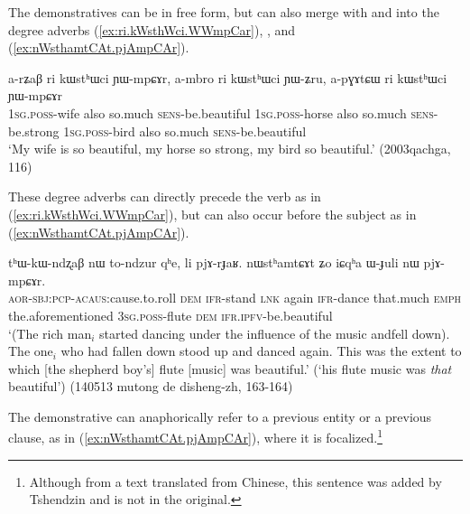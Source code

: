 The demonstratives can be in free form, but can also merge with  and  into the degree adverbs  (\ref{ex:ri.kWsthWci.WWmpCar}), ,  and  (\ref{ex:nWsthamtCAt.pjAmpCAr}).


 \begin{exe}
\ex \label{ex:ri.kWsthWci.WWmpCar}
 \gll  a-rʑaβ ri kɯstʰɯci ɲɯ-mpɕɤr, a-mbro ri kɯstʰɯci ɲɯ-ʑru, a-pɣɤtɕɯ ri kɯstʰɯci ɲɯ-mpɕɤr  \\
 \textsc{1sg}.\textsc{poss}-wife also so.much \textsc{sens}-be.beautiful  \textsc{1sg}.\textsc{poss}-horse also so.much \textsc{sens}-be.strong  \textsc{1sg}.\textsc{poss}-bird also so.much \textsc{sens}-be.beautiful  \\
 \glt `My wife is so beautiful, my horse so strong, my bird so beautiful.' (2003qachga, 116)
 \end{exe}

These degree adverbs can directly precede the verb as in (\ref{ex:ri.kWsthWci.WWmpCar}), but can also occur before the subject as in (\ref{ex:nWsthamtCAt.pjAmpCAr}). 

 \begin{exe}
\ex \label{ex:nWsthamtCAt.pjAmpCAr}
 \gll tʰɯ-kɯ-ndʐaβ nɯ to-ndzur qʰe, li pjɤ-rɟaʁ. nɯstʰamtɕɤt ʑo iɕqʰa ɯ-ɟuli nɯ pjɤ-mpɕɤr. \\
 \textsc{aor}-\textsc{sbj}:\textsc{pcp}-\textsc{acaus}:cause.to.roll \textsc{dem} \textsc{ifr}-stand \textsc{lnk} again \textsc{ifr}-dance that.much \textsc{emph} the.aforementioned \textsc{3sg}.\textsc{poss}-flute \textsc{dem} \textsc{ifr}.\textsc{ipfv}-be.beautiful \\
 \glt `(The rich man$_i$ started dancing under the influence of the music andfell down). The one$_i$ who had fallen down stood up and danced again. This was the extent to which [the shepherd boy's] flute [music] was beautiful.'  (`his flute music was \textit{that} beautiful') (140513 mutong de disheng-zh, 163-164)
 \end{exe}
 
 The demonstrative can anaphorically refer to a previous entity or a previous clause, as in (\ref{ex:nWsthamtCAt.pjAmpCAr}), where it is focalized.\footnote{Although from a text translated from Chinese, this sentence was added by Tshendzin and is not in the original.  }




